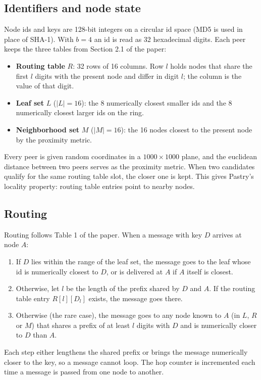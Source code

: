 \documentclass[10pt]{article}
\begin{document}
\subsection{Identifiers and node state}
Node ids and keys are 128-bit integers on a circular id space (MD5 is used in place of SHA-1).
With $b = 4$ an id is read as 32 hexadecimal digits.
Each peer keeps the three tables from Section 2.1 of the paper:
\begin{itemize}
  \item \textbf{Routing table} $R$: 32 rows of 16 columns. Row $l$ holds nodes that share the first $l$ digits with the present node and differ in digit $l$; the column is the value of that digit.
  \item \textbf{Leaf set} $L$ ($|L| = 16$): the 8 numerically closest smaller ids and the 8 numerically closest larger ids on the ring.
  \item \textbf{Neighborhood set} $M$ ($|M| = 16$): the 16 nodes closest to the present node by the proximity metric.
\end{itemize}
Every peer is given random coordinates in a $1000 \times 1000$ plane, and the euclidean distance between two peers serves as the proximity metric.
When two candidates qualify for the same routing table slot, the closer one is kept.
This gives Pastry's locality property: routing table entries point to nearby nodes.

\subsection{Routing}
Routing follows Table 1 of the paper.
When a message with key $D$ arrives at node $A$:
\begin{enumerate}
  \item If $D$ lies within the range of the leaf set, the message goes to the leaf whose id is numerically closest to $D$, or is delivered at $A$ if $A$ itself is closest.
  \item Otherwise, let $l$ be the length of the prefix shared by $D$ and $A$. If the routing table entry $R[l][D_l]$ exists, the message goes there.
  \item Otherwise (the rare case), the message goes to any node known to $A$ (in $L$, $R$ or $M$) that shares a prefix of at least $l$ digits with $D$ and is numerically closer to $D$ than $A$.
\end{enumerate}
Each step either lengthens the shared prefix or brings the message numerically closer to the key, so a message cannot loop.
The hop counter is incremented each time a message is passed from one node to another.
\end{document}
